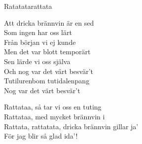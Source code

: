 \begin{song}{Ratatata}{rattata}
\begin{vers}
Att dricka brännvin är en sed\\
Som ingen har oss lärt\\
Från början vi ej kunde\\
Men det var blott temporärt\\
Sen lärde vi oss själva\\
Och nog var det värt besvär't\\
Tutilurenbom tutidalenpang\\
Nog var det värt besvär't\\
\end{vers}
\begin{vers}
\repopen Rattataa, så tar vi oss en tuting\\
Rattataa, med mycket brännvin i\\
Rattata, rattatata, dricka brännvin gillar ja'\\
För jag blir så glad ida'! \repclose\\
\end{vers}
\end{song}
